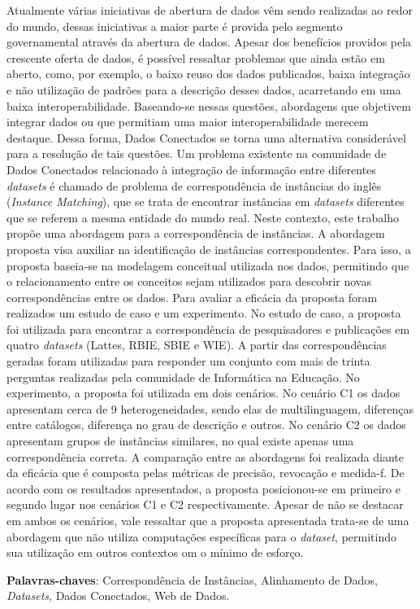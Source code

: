 
\setlength{\absparsep}{18pt} %
\begin{resumo}
Atualmente várias iniciativas de abertura de dados vêm sendo realizadas ao redor do mundo, dessas iniciativas a maior parte é provida pelo segmento governamental através da abertura de dados. Apesar dos benefícios providos pela crescente oferta de dados, é possível ressaltar problemas que ainda estão em aberto, como, por exemplo, o baixo reuso dos dados publicados, baixa integração e não utilização de padrões para a descrição desses dados, acarretando em uma baixa interoperabilidade. Baseando-se nessas questões, abordagens que objetivem integrar dados ou que permitiam uma maior interoperabilidade  merecem destaque. Dessa forma, Dados Conectados se torna uma alternativa considerável para a resolução de tais questões.
Um problema existente na comunidade de Dados Conectados relacionado à integração de informação entre diferentes \textit{datasets} é chamado de problema de correspondência de instâncias do inglês (\textit{Instance Matching}), que se trata de encontrar instâncias em \textit{datasets} diferentes que se referem a mesma entidade do mundo real. Neste contexto, este trabalho propõe uma abordagem para a correspondência de instâncias.
A abordagem proposta visa auxiliar na identificação de instâncias correspondentes. Para isso, a proposta baseia-se na modelagem conceitual utilizada nos dados, permitindo que o relacionamento entre os conceitos sejam utilizados para descobrir novas correspondências entre os dados. Para avaliar a eficácia da proposta foram realizados um estudo de caso e um experimento.  No estudo de caso, a proposta foi utilizada para encontrar a correspondência de pesquisadores e publicações em quatro \textit{datasets} (Lattes, RBIE, SBIE e WIE). A partir das correspondências geradas foram utilizadas para responder um conjunto com mais de trinta perguntas realizadas pela comunidade de Informática na Educação.
No experimento, a proposta foi utilizada em dois cenários. No cenário C1 os dados apresentam cerca de 9 heterogeneidades, sendo elas de multilinguagem, diferenças entre catálogos, diferença no grau de descrição e outros. No cenário C2 os dados apresentam grupos de instâncias similares, no qual existe apenas uma correspondência correta. A comparação entre as abordagens foi realizada diante da eficácia  que é composta pelas métricas de precisão, revocação e medida-f. 
De acordo com os resultados apresentados, a proposta posicionou-se em primeiro e segundo lugar nos cenários C1 e C2 respectivamente. Apesar de não se destacar em ambos os cenários, vale ressaltar que a proposta apresentada trata-se de uma abordagem que não utiliza computações específicas para o \textit{dataset}, permitindo sua utilização em outros contextos om o mínimo de esforço.

 \textbf{Palavras-chaves}: Correspondência de Instâncias, Alinhamento de Dados, \textit{Datasets}, Dados Conectados, Web de Dados.
\end{resumo}

%
% 
